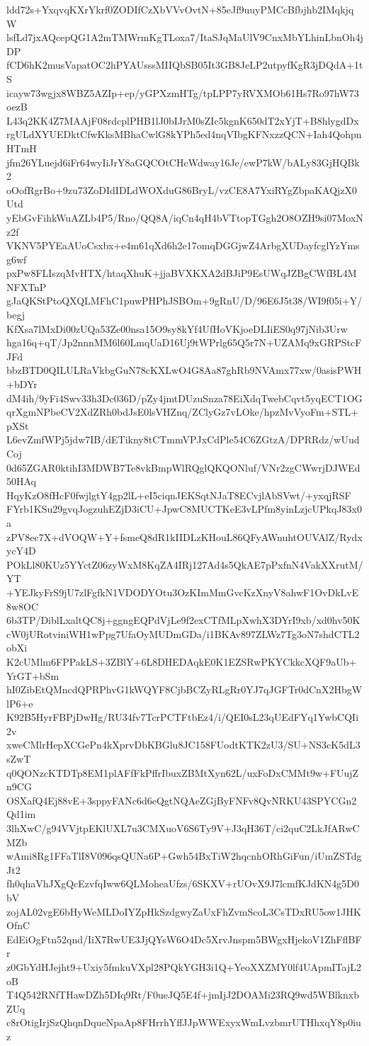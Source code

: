 ldd72s+YxqvqKXrYkrf0ZODIfCzXbVVvOvtN+85eJf9uuyPMCcBfbjhb2IMqkjqW
lsfLd7jxAQcepQG1A2mTMWrmKgTLoxa7/ItaSJqMaUlV9CnxMbYLhinLbnOh4jDP
fCD6hK2musVapatOC2hPYAUsssMIIQbSB05It3GB8JeLP2utpyfKgR3jDQdA+1tS
icayw73wgjx8WBZ5AZIp+ep/yGPXzmHTg/tpLPP7yRVXMOb61Hs7Ro97hW73oezB
L43q2KK4Z7MAAjF08rdcplPHB1lJ0bIJrM0sZIc5kgnK650dT2xYjT+B8hlygdDx
rgULdXYUEDktCfwKksMBhaCwlG8kYPh5ed4nqVIbgKFNxzzQCN+Iah4QohpnHTmH
jfm26YLuejd6iFr64wyIiJrY8aGQCOtCHcWdway16Je/ewP7kW/bALy83GjHQBk2
oOofRgrBo+9zu73ZoDIdIDLdWOXduG86BryL/vzCE8A7YxiRYgZbpaKAQjzX0Utd
yEbGvFihkWuAZLb4P5/Rno/QQ8A/iqCn4qH4bVTtopTGgh2O8OZH9si07MoxNz2f
VKNV5PYEaAUoCsxbx+e4m61qXd6h2e17omqDGGjwZ4ArbgXUDayfcglYzYmsg6wf
pxPw8FLIszqMvHTX/htaqXhuK+jjaBVXKXA2dBJiP9EsUWqJZBgCWfBL4MNFXTnP
gJaQKStPtoQXQLMFhC1puwPHPhJSBOm+9gRnU/D/96E6J5t38/WI9f05i+Y/begj
KfXsa7lMxDi00zUQa53Ze00nsa15O9sy8kYf4UfHoVKjoeDLIiES0q97jNib3Urw
hga16q+qT/Jp2nnnMM6l60LmqUaD16Uj9tWPrlg65Q5r7N+UZAMq9xGRPStcFJFd
bbzBTD0QILULRaVkbgGuN78cKXLwO4G8Aa87ghRb9NVAmx77xw/0asisPWH+bDYr
dM4ih/9yFi4Swv33h3Dc036D/pZy4jmtDUzuSnza78EiXdqTwebCqvt5yqECT1OG
qrXgmNPbeCV2XdZRh0bdJsE0lsVHZnq/ZClyGz7vLOke/hpzMvVyoFm+STL+pXSt
L6evZmfWPj5jdw7IB/dETikny8tCTmmVPJxCdPle54C6ZGtzA/DPRRdz/wUudCoj
0d65ZGAR0ktihI3MDWB7Te8vkBmpWlRQglQKQONluf/VNr2zgCWwrjDJWEd50HAq
HqyKzO8fHcF0fwjlgtY4gp2lL+eI5ciqnJEKSqtNJaT8ECvjlAbSVwt/+yxqjRSF
FYrb1KSu29gvqJogzuhEZjD3iCU+JpwC8MUCTKeE3vLPfm8yinLzjcUPkqJ83x0a
zPV8ec7X+dVOQW+Y+fsmeQ8dR1kIIDLzKHouL86QFyAWnuhtOUVAlZ/RydxycY4D
POkLl80KUz5YYctZ06zyWxM8KqZA4IRj127Ad4s5QkAE7pPxfnN4VakXXrutM/YT
+YEJkyFrS9jU7zlFgfkN1VDODYOtu3OzKImMmGvcKzXnyV8ahwF1OvDkLvE8w8OC
6b3TP/DiblLxaltQC8j+ggngEQPdVjLe9f2exCTfMLpXwhX3DYrI9xb/xd0hv50K
cW0jURotviniWH1wPpg7UfaOyMUDmGDa/i1BKAv897ZLWz7Tg3oN7shdCTL2obXi
K2cUMlm6FPPakLS+3ZBlY+6L8DHEDAqkE0K1EZSRwPKYCkkcXQF9aUb+YrGT+bSm
hI0ZibEtQMncdQPRPhvG1kWQYF8CjbBCZyRLgRr0YJ7qJGFTr0dCnX2HbgWlP6+e
K92B5HyrFBPjDwHg/RU34fv7TcrPCTFtbEz4/i/QEI0sL23qUEdFYq1YwbCQIi2v
xweCMlrHepXCGePn4kXprvDbKBGlu8JC158FUodtKTK2zU3/SU+NS3cK5dL3sZwT
q0QONzcKTDTp8EM1plAFfFkPffrIbuxZBMtXyn62L/uxFoDxCMMt9w+FUujZn9CG
OSXafQ4Ej88vE+3sppyFANc6d6eQgtNQAeZGjByFNFv8QvNRKU43SPYCGn2Qd1im
3lhXwC/g94VVjtpEKlUXL7u3CMXuoV6S6Ty9V+J3qH36T/ci2quC2LkJfARwCMZb
wAmi8Rg1FFaTlI8V096qsQUNa6P+Gwh54BxTiW2hqcnhORhGiFun/iUmZSTdgJt2
fh0qhaVhJXgQcEzvfqIww6QLMoheaUfzs/6SKXV+rUOvX9J7lcmfKJdKN4g5D0bV
zojAL02vgE6bHyWeMLDoIYZpHkSzdgwyZaUxFhZvmScoL3CsTDxRU5ow1JHKOfnC
EdEiOgFtn52qnd/IiX7RwUE3JjQYsW6O4Dc5XrvJnspm5BWgxHjekoV1ZhFflBFr
z0GbYdHJejht9+Uxiy5fmkuVXpl28PQkYGH3i1Q+YeoXXZMY0lf4UApmITajL2oB
T4Q542RNfTHawDZh5DIq9Rt/F0ueJQ5E4f+jmIjJ2DOAMi23RQ9wd5WBlknxbZUq
c8rOtigIrjSzQhqnDqueNpaAp8FHrrhYffJJpWWExyxWmLvzbmrUTHhxqY8p0iuz
